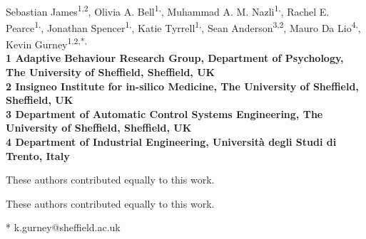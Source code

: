 \documentclass[10pt,letterpaper]{article}
\date{}
\begin{document}
\vspace*{0.35in}

\begin{flushleft}
{\Large
\textbf{}
}
\newline
\\
Sebastian James\textsuperscript{1,2},
Olivia A. Bell\textsuperscript{1,\Yinyang},
Muhammad A. M. Nazli\textsuperscript{1,\Yinyang},
Rachel E. Pearce\textsuperscript{1,\Yinyang},
Jonathan Spencer\textsuperscript{1,\Yinyang},
Katie Tyrrell\textsuperscript{1,\Yinyang},
Sean Anderson\textsuperscript{3,2},
Mauro Da Lio\textsuperscript{4,\ddag},
Kevin Gurney\textsuperscript{1,2,*,\ddag}
\\
\bigskip
\bf{1} Adaptive Behaviour Research Group, Department of Psychology, The University of Sheffield, Sheffield, UK
\\
\bf{2} Insigneo Institute for in-silico Medicine, The University of Sheffield, Sheffield, UK
\\
\bf{3} Department of Automatic Control Systems Engineering, The University of Sheffield, Sheffield, UK
\\
\bf{4} Department of Industrial Engineering, Universit\`{a} degli Studi di Trento, Italy
\\\bigskip

%
%
\Yinyang These authors contributed equally to this work.

\ddag These authors contributed equally to this work.



* k.gurney@sheffield.ac.uk

\end{flushleft}
\end{document}
